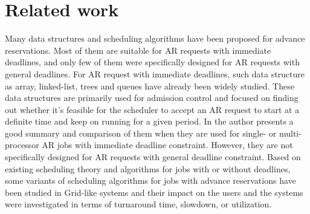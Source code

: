 \documentclass[preprint,12pt]{elsarticle}
\begin{document}
\section{Related work}
\label{sec:introduce}

Many data structures and scheduling algorithms have been proposed for advance reservations. Most of them are suitable for AR requests with immediate deadlines, and only few of them were specifically designed for AR requests with general deadlines. For AR request with immediate deadlines, such data structure as array\cite{burchard2005analysis}, linked-list\cite{xiong2005linked},
trees\cite{wang2002bandwidth,burchard2005analysis,nie2010flexible} and queues\cite{brown1988calendar,Sulistio2009} have already been widely studied. These data structures are primarily used for admission control and focused on finding out whether it's feasible for the scheduler to accept an AR request to start at a definite time and keep on running for a given period. In \cite{Sulistio2009} the author presents a good summary and comparison of them when they are used for single- or multi-processor AR jobs with immediate deadline constraint. However, they are not specifically designed for AR requests with general deadline constraint.
Based on existing scheduling theory and algorithms for jobs with or without deadlines, some variants of scheduling algorithms for jobs with advance reservations have been studied in Grid-like systems\cite{netto2010sla,naiksatam2007elastic,balakrishnan2010sla,nie2010flexible} and their impact on the users and the systems were investigated in terms of turnaround time, slowdown, or utilization.
\end{document}
